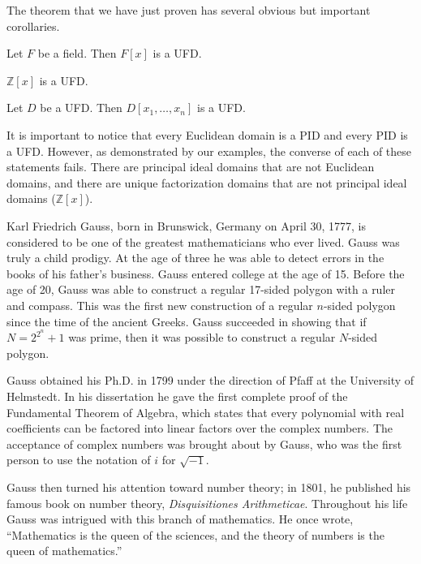 \medskip


The theorem that we have just proven has several obvious but important 
corollaries. 
 

\begin{corollary}
Let $F$ be a field. Then $F[x]$ is a UFD.
\end{corollary}


\begin{corollary}\label{domains:int_poly_UFD_corollary}
${\mathbb Z}[x]$ is a UFD.
\end{corollary}


\begin{corollary}
Let $D$ be a UFD. Then $D[x_1, \ldots, x_n]$ is a UFD. 
\end{corollary} 



It is important to notice that every Euclidean domain is a PID and
every PID is a UFD. However, as demonstrated by our examples, the
converse of each of these statements fails.  There are principal
ideal domains that are not Euclidean domains, and there are unique
factorization domains that are not principal ideal domains (${\mathbb
Z}[x]$). 

\histhead

\noindent
Karl Friedrich Gauss, born in Brunswick, Germany on April 30, 1777, is considered to be one of the greatest
mathematicians who ever lived.  Gauss was truly a child prodigy.  At the age of three he was able to detect errors in the books of his father's
business.  Gauss entered college at the age of 15.  Before the age of 20, Gauss was able to construct a regular 17-sided polygon with a ruler
and compass.  This was the first new construction of a regular $n$-sided polygon since the time of the ancient Greeks.  Gauss succeeded in showing that if $N= 2^{2^n}+1$ was prime, then it was possible to construct a regular $N$-sided polygon.  

Gauss obtained his Ph.D. in 1799 under the direction of Pfaff at the University of Helmstedt.  In his dissertation he gave the first complete proof of the Fundamental Theorem of Algebra, which states that every polynomial with real coefficients can be factored into linear factors over the complex numbers.  The acceptance of complex numbers was brought about by Gauss, who was the first person to use the notation of $i$ for $\sqrt{-1}$. 

Gauss then turned his attention toward number theory; in 1801, he published his famous book on number theory, {\it Disquisitiones
Arithmeticae}.  Throughout his life Gauss was intrigued with this branch of mathematics.  He once wrote, ``Mathematics is the queen of the sciences, and the theory of numbers is the queen of mathematics.'' 

